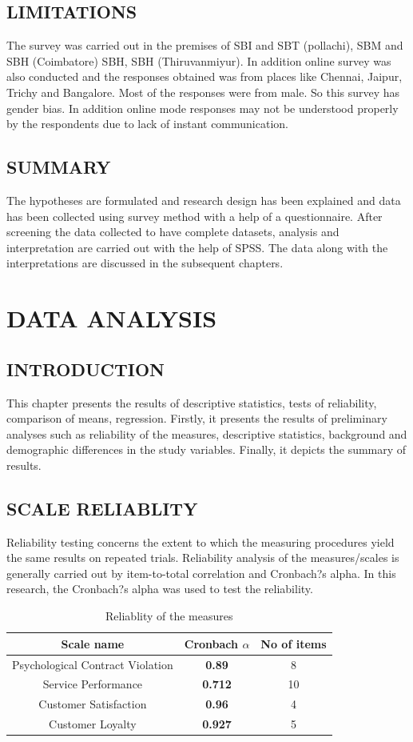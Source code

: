 \documentclass[a4paper, 14pt]{article}
\begin{document}
{\subsection{LIMITATIONS}
The survey was carried out in the premises of SBI and SBT (pollachi), SBM and SBH (Coimbatore) SBH, SBH (Thiruvanmiyur). In addition online survey was also conducted and the responses obtained was from places like Chennai, Jaipur, Trichy and Bangalore. Most of the responses were from male. So this survey has gender bias. In addition online mode responses may not be understood properly by the respondents due to lack of instant communication. 

\subsection{SUMMARY}
The hypotheses are formulated and research design has been explained and data has been collected using survey method with a help of a questionnaire. After screening the data collected to have complete datasets, analysis and interpretation are carried out with the help of SPSS. The data along with the interpretations are discussed in the subsequent chapters.

\newpage
\section{DATA ANALYSIS}
\subsection{INTRODUCTION}
This chapter presents the results of descriptive statistics, tests of reliability, comparison of means, regression. Firstly, it presents the results of preliminary analyses such as reliability of the measures, descriptive statistics, background and demographic differences in the study variables. Finally, it depicts the summary of results.

\subsection{SCALE RELIABLITY}
Reliability testing concerns the extent to which the measuring procedures yield the same results on repeated trials. Reliability analysis of the measures/scales is generally carried out by item-to-total correlation and Cronbach?s alpha. In this research, the Cronbach?s  alpha was used to test the reliability.
\begin{table}[H]
\centering
\begin{tabular}{|c|c|c|}
\hline
\textbf{Scale name} & \textbf{Cronbach $\alpha$} & \textbf{No of items}\\
\hline
Psychological Contract Violation & \textbf{0.89} & 8\\
\hline
Service Performance & \textbf{0.712} & 10\\
\hline
Customer Satisfaction & \textbf{0.96} & 4\\
\hline
Customer Loyalty & \textbf{0.927} & 5 \\
\hline
\end{tabular}
\caption{Reliablity of the measures}
\end{table}

}
\end{document}
